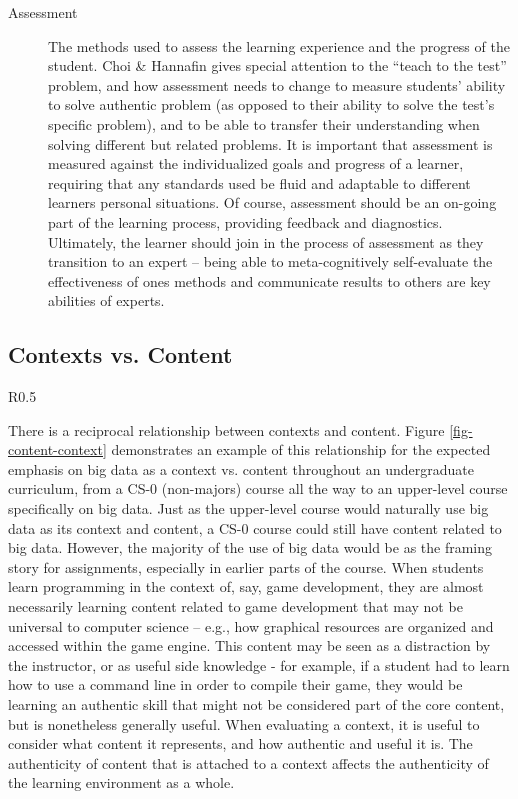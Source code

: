 \begin{description}
	\item[Assessment] The methods used to assess the learning experience and the progress of the student.
	Choi \& Hannafin gives special attention to the “teach to the test” problem, and how assessment needs to change to measure students' ability to solve authentic problem (as opposed to their ability to solve the test’s specific problem), and to be able to transfer their understanding when solving different but related problems.
	It is important that assessment is measured against the individualized goals and progress of a learner, requiring that any standards used be fluid and adaptable to different learners personal situations.
	Of course, assessment should be an on-going part of the learning process, providing feedback and diagnostics.
	Ultimately, the learner should join in the process of assessment as they transition to an expert – being able to meta-cognitively self-evaluate the effectiveness of ones methods and communicate results to others are key abilities of experts. 
\end{description}

\subsection{Contexts vs. Content}

\begin{wrapfigure}{R}{0.5\textwidth}
		\begin{center}
		\end{center}
		\caption{Content vs. Context}
		\label{fig-content-context}
\end{wrapfigure}

There is a reciprocal relationship between contexts and content.
Figure \ref{fig-content-context} demonstrates an example of this relationship for the expected emphasis on big data as a context vs. content throughout an undergraduate curriculum, from a CS-0 (non-majors) course all the way to an upper-level course specifically on big data.
Just as the upper-level course would naturally use big data as its context and content, a CS-0 course could still have content related to big data.
However, the majority of the use of big data would be as the framing story for assignments, especially in earlier parts of the course.
When students learn programming in the context of, say, game development, they are almost necessarily learning content related to game development that may not be universal to computer science -- e.g., how graphical resources are organized and accessed within the game engine.
This content may be seen as a distraction by the instructor, or as useful side knowledge - for example, if a student had to learn how to use a command line in order to compile their game, they would be learning an authentic skill that might not be considered part of the core content, but is nonetheless generally useful.
When evaluating a context, it is useful to consider what content it represents, and how authentic and useful it is.
The authenticity of content that is attached to a context affects the authenticity of the learning environment as a whole.

